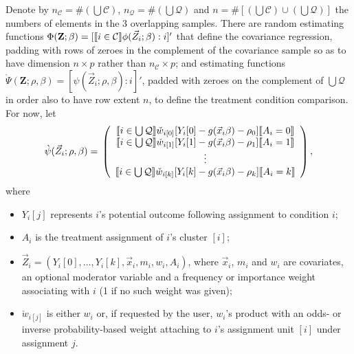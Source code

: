 \documentclass{article}
\DeclarePairedDelimiter{\indicator}{\llbracket}{\rrbracket}
\newcommand{\owt}[1][{[a_i]}]{\ensuremath{\check{w}_{i#1}}}
\begin{document}
Denote by $n_{\mathcal{C}}= \# \left( \bigcup \mathcal{C}\right)$,
$n_{\mathcal{Q}}= \# \left( \bigcup \mathcal{Q}\right)$ and
$n = \# \left[\left( \bigcup \mathcal{C}\right) \cup \left(\bigcup
    \mathcal{Q}\right)\right]$ the numbers of elements in the 3
overlapping samples. There are random estimating functions
$\Phi(\mathbf{Z}; \beta ) = [\indicator{ i \in
  \mathcal{C}}\phi(\vec{Z}_{i}; \beta) : i]'$ that define the covariance
regression, padding with rows of zeroes in
the complement of the covariance sample so
as to have dimension $n \times p$ rather than $n_{\mathcal{C}}\times
p$; and estimating functions 
$\grave{\Psi}(\mathbf{Z}; \rho, \beta) = [\psi(\vec{Z}_{i}; \rho,
\beta): i]'$, padded with zeroes on the complement of $\bigcup
\mathcal{Q}$ in order also to have row extent $n$, to define the
treatment condition comparison.  For now, let
\begin{equation}
         \label{eq:5}
         \grave{\psi}(\vec{Z}_{i}; \rho, \beta) =\\
         \left( \begin{array}{c}
           \indicator{i \in \bigcup \mathcal{Q}}\owt[{[0]}] [Y_{i}[0] - g(\vec{x}_{i}\beta)-
                  \rho_{0}]\indicator{A_{i}=0}\\
           \indicator{i \in \bigcup \mathcal{Q}}\owt[{[1]}] [Y_{i}[1] - g(\vec{x}_{i}\beta)-
                  \rho_{1}]\indicator{A_{i}=1}\\
                  \vdots \\
           \indicator{i \in \bigcup \mathcal{Q}}\owt[{[k]}] [Y_{i}[k] - g(\vec{x}_{i}\beta)-
                  \rho_{k}]\indicator{A_{i}=k}\\
                \end{array}\right),
\end{equation}
where
\begin{itemize}
\item $Y_{i}[j]$ represents $i$'s potential outcome following
  assignment to condition $i$;
\item $A_{i}$ is the treatment assignment of $i$'s cluster $[i]$;
\item $\vec{Z}_{i} = (Y_{i}[0],\ldots, Y_{i}[k], \vec{x}_{i}, m_{i}, w_{i}, A_{i})$, where $\vec{x}_{i}$, $m_{i}$ and $w_{i}$ are covariates, an optional moderator variable and a
  frequency or importance weight associating with $i$ (1 if no such weight was
  given); 
\item $\owt[{[j]}]$ is either $w_i$ or, 
   if requested by the user, $w_{i}$'s product with an
  odds- or inverse probability-based weight attaching to $i$'s
  assignment unit $[i]$ under assignment $j$.
\end{itemize}
\end{document}
